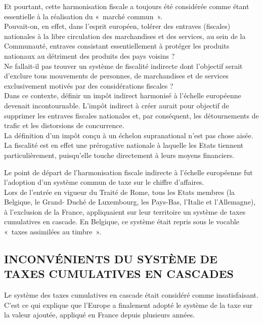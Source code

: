 \documentclass{book}
\begin{document}
Et pourtant, cette harmonisation fiscale a toujours été considérée comme étant essentielle à la
réalisation du «~marché commun~».\\

Pouvait-on, en effet, dans l'esprit européen, tolérer des entraves (fiscales) nationales à la libre
circulation des marchandises et des services, au sein de la Communauté, entraves consistant
essentiellement à protéger les produits nationaux au détriment des produits des pays voisins ?\\

Ne fallait-il pas trouver un système de fiscalité indirecte dont l'objectif serait d'exclure tous
mouvements de personnes, de marchandises et de services exclusivement motivés par des
considérations fiscales ?\\

Dans ce contexte, définir un impôt indirect harmonisé à l'échelle européenne devenait
incontournable. L’impôt indirect à créer aurait pour objectif de supprimer les entraves
fiscales nationales et, par conséquent, les détournements de trafic et les distorsions de
concurrence.\\

La définition d'un impôt conçu à un échelon supranational n'est pas chose aisée. La fiscalité
est en effet une prérogative nationale à laquelle les Etats tiennent particulièrement, puisqu'elle
touche directement à leurs moyens financiers.

Le point de départ de l'harmonisation fiscale indirecte à l'échelle européenne fut l'adoption
d'un système commun de taxe sur le chiffre d'affaires.\\

Lors de l'entrée en vigueur du Traité de Rome, tous les Etats membres (la Belgique, le Grand-
Duché de Luxembourg, les Pays-Bas, l'Italie et l'Allemagne), à l'exclusion de la France,
appliquaient sur leur territoire un système de taxes cumulatives en cascade. En Belgique, ce
système était repris sous le vocable «~taxes assimilées au timbre~».\\

\subsection{INCONVÉNIENTS DU SYSTÈME DE TAXES CUMULATIVES EN CASCADES}

Le système des taxes cumulatives en cascade était considéré comme insatisfaisant. C'est
ce qui explique que l'Europe a finalement adopté le système de la taxe sur la valeur ajoutée,
appliqué en France depuis plusieurs années.\\
\end{document}
